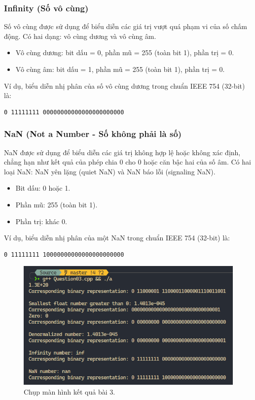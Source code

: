 \subsubsection{Infinity (Số vô cùng)}

Số vô cùng được sử dụng để biểu diễn các giá trị vượt quá phạm vi của số chấm động. Có hai dạng: vô cùng dương và vô cùng âm.

\begin{itemize}
    \item Vô cùng dương: bit dấu = 0, phần mũ = 255 (toàn bit 1), phần trị = 0.
    \item Vô cùng âm: bit dấu = 1, phần mũ = 255 (toàn bit 1), phần trị = 0.
\end{itemize}

Ví dụ, biểu diễn nhị phân của số vô cùng dương trong chuẩn IEEE 754 (32-bit) là:
\begin{verbatim}
0 11111111 00000000000000000000000
\end{verbatim}

\subsubsection{NaN (Not a Number - Số không phải là số)}

NaN được sử dụng để biểu diễn các giá trị không hợp lệ hoặc không xác định, chẳng hạn như kết quả của phép chia 0 cho 0 hoặc căn bậc hai của số âm. Có hai loại NaN: NaN yên lặng (quiet NaN) và NaN báo lỗi (signaling NaN).

\begin{itemize}
    \item Bit dấu: 0 hoặc 1.
    \item Phần mũ: 255 (toàn bit 1).
    \item Phần trị: khác 0.
\end{itemize}

Ví dụ, biểu diễn nhị phân của một NaN trong chuẩn IEEE 754 (32-bit) là:
\begin{verbatim}
0 11111111 10000000000000000000000
\end{verbatim}

\begin{figure}[H]
    \centering
    \includegraphics[width=\textwidth]{images/img3.PNG}
    \caption{Chụp màn hình kết quả bài 3.}
\end{figure}

